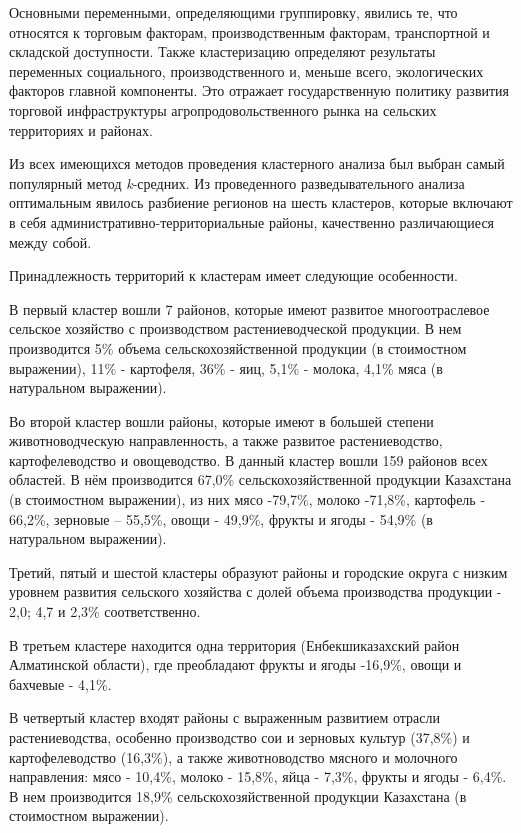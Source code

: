 Основными переменными, определяющими группировку, явились те, что
относятся к торговым факторам, производственным факторам, транспортной и
складской доступности. Также кластеризацию определяют результаты
переменных социального, производственного и, меньше всего, экологических
факторов главной компоненты. Это отражает государственную политику
развития торговой инфраструктуры агропродовольственного рынка на
сельских территориях и районах.

Из всех имеющихся методов проведения кластерного анализа был выбран
самый популярный метод \emph{k}-средних. Из проведенного
разведывательного анализа оптимальным явилось разбиение регионов на
шесть кластеров, которые включают в себя административно-территориальные
районы, качественно различающиеся между собой.

Принадлежность территорий к кластерам имеет следующие особенности.

В первый кластер вошли 7 районов, которые имеют развитое многоотраслевое
сельское хозяйство с производством растениеводческой продукции. В нем
производится 5\% объема сельскохозяйственной продукции (в стоимостном
выражении), 11\% - картофеля, 36\% - яиц, 5,1\% - молока, 4,1\% мяса (в
натуральном выражении).

Во второй кластер вошли районы, которые имеют в большей степени
животноводческую направленность, а также развитое растениеводство,
картофелеводство и овощеводство. В данный кластер вошли 159 районов всех
областей. В нём производится 67,0\% сельскохозяйственной продукции
Казахстана (в стоимостном выражении), из них мясо -79,7\%, молоко
-71,8\%, картофель - 66,2\%, зерновые -- 55,5\%, овощи - 49,9\%, фрукты
и ягоды - 54,9\% (в натуральном выражении).

Третий, пятый и шестой кластеры образуют районы и городские округа с
низким уровнем развития сельского хозяйства с долей объема производства
продукции - 2,0; 4,7 и 2,3\% соответственно.

В третьем кластере находится одна территория (Енбекшиказахский район
Алматинской области), где преобладают фрукты и ягоды -16,9\%, овощи и
бахчевые - 4,1\%.

В четвертый кластер входят районы с выраженным развитием отрасли
растениеводства, особенно производство сои и зерновых культур (37,8\%) и
картофелеводство (16,3\%), а также животноводство мясного и молочного
направления: мясо - 10,4\%, молоко - 15,8\%, яйца - 7,3\%, фрукты и
ягоды - 6,4\%. В нем производится 18,9\% сельскохозяйственной продукции
Казахстана (в стоимостном выражении).


